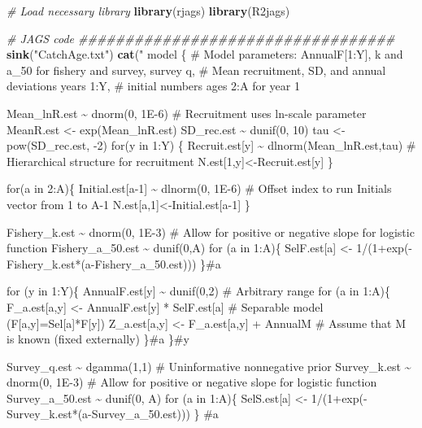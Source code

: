\documentclass[
]{krantz}
\makeatletter
\newenvironment{Shaded}{\begin{snugshade}}{\end{snugshade}}
\newcommand{\CommentTok}[1]{\textcolor[rgb]{0.37,0.37,0.37}{\textit{#1}}}
\newcommand{\FunctionTok}[1]{\textcolor[rgb]{0.27,0.27,0.27}{\textbf{#1}}}
\newcommand{\NormalTok}[1]{#1}
\newcommand{\StringTok}[1]{\textcolor[rgb]{0.5,0.5,0.5}{#1}}
\newenvironment{kframe}{%
\medskip{}
\setlength{\fboxsep}{.8em}
 \def\at@end@of@kframe{}%
 \ifinner\ifhmode%
  \def\at@end@of@kframe{\end{minipage}}%
  \begin{minipage}{\columnwidth}%
 \fi\fi%
 \def\FrameCommand##1{\hskip\@totalleftmargin \hskip-\fboxsep
 \colorbox{shadecolor}{##1}\hskip-\fboxsep
     \hskip-\linewidth \hskip-\@totalleftmargin \hskip\columnwidth}%
 \MakeFramed {\advance\hsize-\width
   \@totalleftmargin\z@ \linewidth\hsize
   \@setminipage}}%
 {\par\unskip\endMakeFramed%
 \at@end@of@kframe}
\renewenvironment{Shaded}{\begin{kframe}}{\end{kframe}}
\makeatother
\begin{document}
\begin{Shaded}
\begin{Highlighting}[]
\CommentTok{\# Load necessary library}
\FunctionTok{library}\NormalTok{(rjags)}
\FunctionTok{library}\NormalTok{(R2jags)}

\CommentTok{\# JAGS code \#\#\#\#\#\#\#\#\#\#\#\#\#\#\#\#\#\#\#\#\#\#\#\#\#\#\#\#\#\#\#\#\#\#}
\FunctionTok{sink}\NormalTok{(}\StringTok{"CatchAge.txt"}\NormalTok{)}
\FunctionTok{cat}\NormalTok{(}\StringTok{"}
\StringTok{model \{}
\StringTok{\# Model parameters: AnnualF[1:Y], k and a\_50 for fishery and survey, survey q,}
\StringTok{\# Mean recruitment, SD, and annual deviations years 1:Y,}
\StringTok{\# initial numbers ages 2:A for year 1}

\StringTok{ Mean\_lnR.est \textasciitilde{} dnorm(0, 1E{-}6)}
\StringTok{   \# Recruitment uses ln{-}scale parameter}
\StringTok{ MeanR.est \textless{}{-} exp(Mean\_lnR.est)}
\StringTok{ SD\_rec.est \textasciitilde{} dunif(0, 10)}
\StringTok{ tau \textless{}{-} pow(SD\_rec.est, {-}2)}
\StringTok{ for(y in 1:Y) \{}
\StringTok{    Recruit.est[y] \textasciitilde{} dlnorm(Mean\_lnR.est,tau)}
\StringTok{     \# Hierarchical structure for recruitment}
\StringTok{    N.est[1,y]\textless{}{-}Recruit.est[y] \}}

\StringTok{    for(a in 2:A)\{}
\StringTok{      Initial.est[a{-}1] \textasciitilde{} dlnorm(0, 1E{-}6)}
\StringTok{        \# Offset index to run Initials vector from 1 to A{-}1}
\StringTok{    N.est[a,1]\textless{}{-}Initial.est[a{-}1] \}}

\StringTok{Fishery\_k.est \textasciitilde{} dnorm(0, 1E{-}3)}
\StringTok{  \# Allow for positive or negative slope for logistic function}
\StringTok{Fishery\_a\_50.est \textasciitilde{} dunif(0,A)}
\StringTok{for (a in 1:A)\{}
\StringTok{  SelF.est[a] \textless{}{-} 1/(1+exp({-}Fishery\_k.est*(a{-}Fishery\_a\_50.est)))}
\StringTok{  \}\#a}

\StringTok{for (y in 1:Y)\{}
\StringTok{  AnnualF.est[y] \textasciitilde{} dunif(0,2) \# Arbitrary range}
\StringTok{  for (a in 1:A)\{}
\StringTok{    F\_a.est[a,y] \textless{}{-} AnnualF.est[y] * SelF.est[a]}
\StringTok{      \# Separable model (F[a,y]=Sel[a]*F[y])}
\StringTok{    Z\_a.est[a,y] \textless{}{-} F\_a.est[a,y] + AnnualM}
\StringTok{      \# Assume that M is known (fixed externally)}
\StringTok{  \}\#a}
\StringTok{\}\#y}

\StringTok{Survey\_q.est \textasciitilde{} dgamma(1,1) \# Uninformative nonnegative prior}
\StringTok{Survey\_k.est \textasciitilde{} dnorm(0, 1E{-}3)}
\StringTok{  \# Allow for positive or negative slope for logistic function}
\StringTok{Survey\_a\_50.est \textasciitilde{} dunif(0, A)}
\StringTok{for (a in 1:A)\{}
\StringTok{  SelS.est[a] \textless{}{-} 1/(1+exp({-}Survey\_k.est*(a{-}Survey\_a\_50.est)))}
\StringTok{  \} \#a}


\end{Highlighting}
\end{Shaded}
\end{document}
